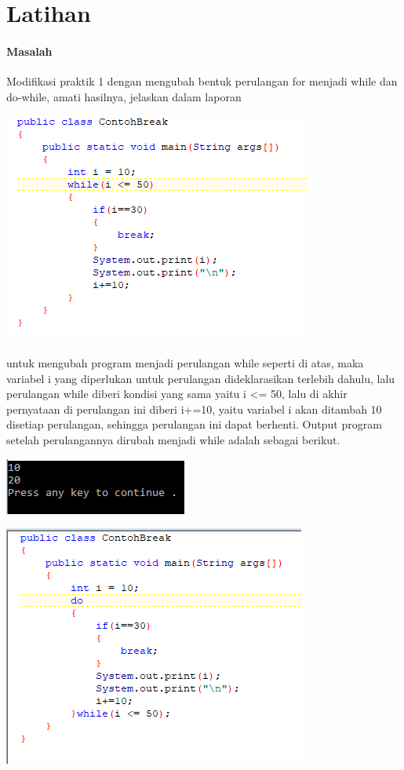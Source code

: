 \documentclass[a4paper,12pt]{article}
\begin{document}
\section{Latihan}
\paragraph{Masalah\\}
Modifikasi praktik 1 dengan mengubah bentuk perulangan for menjadi while dan do-while, amati hasilnya, jelaskan dalam laporan
\begin{center}
    \includegraphics[scale=1]{image7}
\end{center}
untuk mengubah program menjadi perulangan while seperti di atas, maka variabel i yang diperlukan untuk perulangan dideklarasikan terlebih dahulu, lalu perulangan while diberi kondisi yang sama yaitu i <= 50, lalu di akhir pernyataan di perulangan ini diberi i+=10, yaitu variabel i akan ditambah 10 disetiap perulangan, sehingga perulangan ini dapat berhenti. Output program setelah perulangannya dirubah menjadi while adalah sebagai berikut.
\begin{center}
    \includegraphics[scale=1]{image8}
\end{center}
\begin{center}
    \includegraphics[scale=1]{image9}
\end{center}
\end{document}
